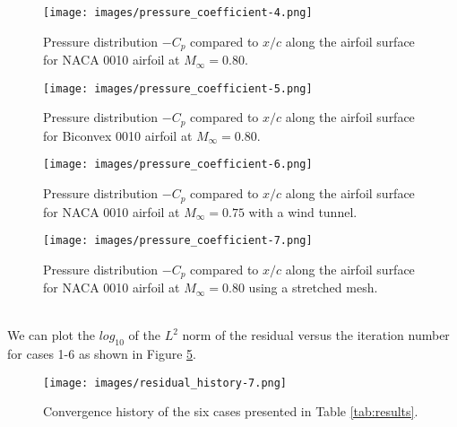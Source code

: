 \begin{figure}
    \centering
    \texttt{[image: images/pressure\_coefficient-4.png]}
    \caption{Pressure distribution $-C_p$ compared to $x/c$ along the airfoil surface for NACA 0010 airfoil at $M_\infty = 0.80$.}
    \label{fig:pressure_coefficient-4}
\end{figure}

\begin{figure}
    \centering
    \texttt{[image: images/pressure\_coefficient-5.png]}
    \caption{Pressure distribution $-C_p$ compared to $x/c$ along the airfoil surface for Biconvex 0010 airfoil at $M_\infty = 0.80$.}
    \label{fig:pressure_coefficient-5}
\end{figure}

\begin{figure}
    \centering
    \texttt{[image: images/pressure\_coefficient-6.png]}
    \caption{Pressure distribution $-C_p$ compared to $x/c$ along the airfoil surface for NACA 0010 airfoil at $M_\infty = 0.75$ with a wind tunnel.}
    \label{fig:pressure_coefficient-6}
\end{figure}

\begin{figure}
    \centering
    \texttt{[image: images/pressure\_coefficient-7.png]}
    \caption{Pressure distribution $-C_p$ compared to $x/c$ along the airfoil surface for NACA 0010 airfoil at $M_\infty = 0.80$ using a stretched mesh.}
    \label{fig:pressure_coefficient-7}
\end{figure}

\vspace{1cm}


\\

We can plot the $log_{10}$ of the $L^2$ norm of the residual versus the iteration number for cases 1-6 as shown in Figure \ref{fig:residual_history-7.png}.

\begin{figure}
    \centering
    \texttt{[image: images/residual\_history-7.png]}
    \caption{Convergence history of the six cases presented in Table \ref{tab:results}.}
    \label{fig:residual_history-7.png}
\end{figure}


